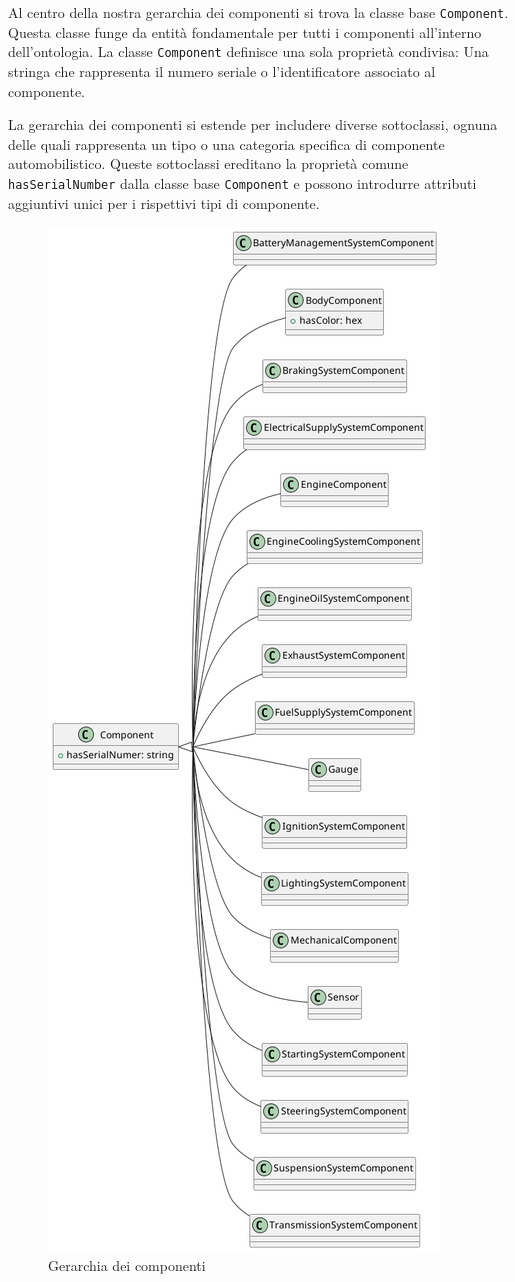 Al centro della nostra gerarchia dei componenti si trova la classe base \texttt{Component}. Questa classe funge da entità fondamentale per tutti i componenti all'interno dell'ontologia. La classe \texttt{Component} definisce una sola proprietà condivisa: Una stringa che rappresenta il numero seriale o l'identificatore associato al componente.

La gerarchia dei componenti si estende per includere diverse sottoclassi, ognuna delle quali rappresenta un tipo o una categoria specifica di componente automobilistico. Queste sottoclassi ereditano la proprietà comune \texttt{hasSerialNumber} dalla classe base \texttt{Component} e possono introdurre attributi aggiuntivi unici per i rispettivi tipi di componente.

\begin{figure}[H]
    \caption{Gerarchia dei componenti}
    \includegraphics[height=\textheight]{figures/carpedia-component.png}

\end{figure}
